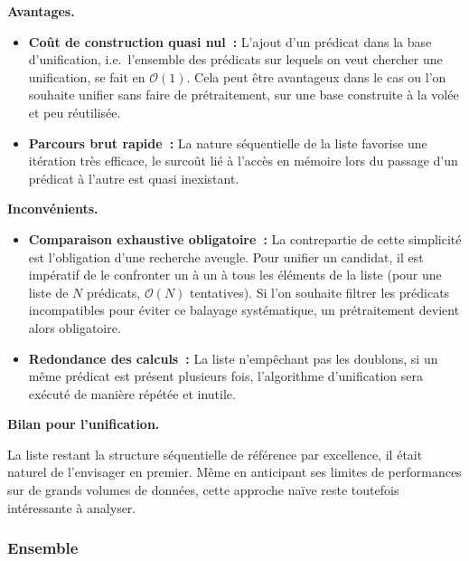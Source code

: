 \documentclass[11pt]{article}
\newenvironment{paraph}[1]{%
  \medskip
  \noindent\textbf{#1.}\quad

  \vspace{0.2cm}
}{%
  \medskip
}
\begin{document}
\begin{paraph}{Avantages}
    \begin{itemize}
        \item \textbf{Coût de construction quasi nul~:} L'ajout d'un 
        prédicat dans la base d'unification, i.e.~l'ensemble des prédicats
        sur lequels on veut chercher une unification, se fait en $\mathcal{O}(1)$. 
        Cela peut être avantageux dans le cas ou l'on souhaite 
        unifier sans faire de prétraitement, sur une base construite 
        à la volée et peu réutilisée.
        \item \textbf{Parcours brut rapide~:} La nature séquentielle 
        de la liste favorise une itération très efficace, le surcoût 
        lié à l'accès en mémoire lors du passage d'un prédicat à l'autre 
        est quasi inexistant.
    \end{itemize}
\end{paraph}

\begin{paraph}{Inconvénients}
    \begin{itemize}
    \item \textbf{Comparaison exhaustive obligatoire~:} La contrepartie 
    de cette simplicité est l'obligation d'une recherche aveugle. 
    Pour unifier un candidat, il est impératif de le confronter 
    un à un à tous les éléments de la liste 
    (pour une liste de $N$ prédicats, $\mathcal{O}(N)$  tentatives). 
    Si l'on souhaite filtrer les prédicats incompatibles pour éviter 
    ce balayage systématique, un prétraitement devient alors obligatoire.
    \item \textbf{Redondance des calculs~:} La liste n'empêchant pas 
    les doublons, si un même prédicat est présent plusieurs fois, 
    l'algorithme d'unification sera exécuté de manière répétée et inutile.
\end{itemize}
\end{paraph}

\begin{paraph}{Bilan pour l'unification}
    La liste restant la structure séquentielle de référence par 
    excellence, il était naturel de l’envisager en premier. 
    Même en anticipant ses limites de performances sur de grands 
    volumes de données, cette approche naïve reste toutefois intéressante à analyser.
\end{paraph}

\subsubsection{Ensemble}
\end{document}
